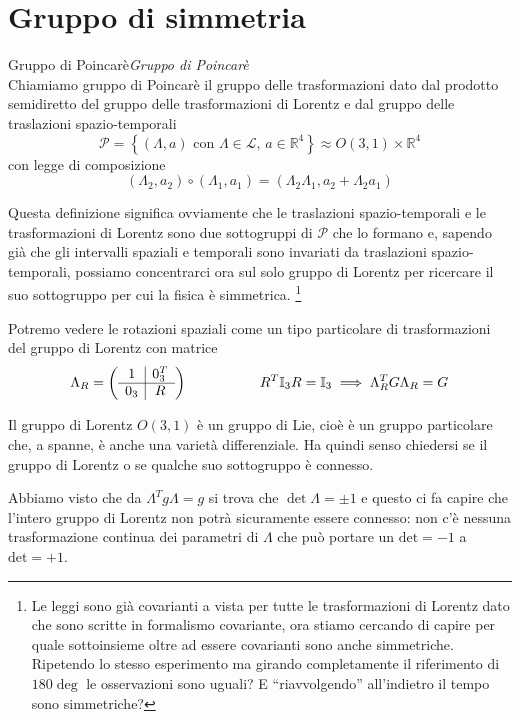 \documentclass[12pt,a4paper,titlepage, twoside, openright]{book}
\newenvironment{definizione}[1][\empty]{\begin{Definizione}{
\ifx\empty#1\relax\else\mdseries\itshape#1\\\fi
}{}}{\end{Definizione}}
\numberwithin{equation}{chapter}
\begin{document}
\section{Gruppo di simmetria}\label{sezGruppo}

\begin{definizione}[Gruppo di Poincarè]
Chiamiamo gruppo di Poincarè il gruppo delle trasformazioni dato dal prodotto semidiretto del gruppo delle trasformazioni di Lorentz e dal gruppo delle traslazioni spazio-temporali
\[
\mathcal{P}=\left\{ (\Lambda,a) \text{ con } \Lambda\in\mathcal{L},\, a\in\mathbb{R}^4   \right\} \approx O(3,1)\times\mathbb{R}^4
\]
con legge di composizione
\[
\left(\Lambda_2,a_2\right) \circ \left(\Lambda_1,a_1\right) = \left(\Lambda_2\Lambda_1, a_2+\Lambda_2a_1\right)
\]
\end{definizione}

Questa definizione significa ovviamente che le traslazioni spazio-temporali e le trasformazioni di Lorentz sono due sottogruppi di $\mathcal{P}$ che lo formano e, sapendo già che gli intervalli spaziali e temporali sono invariati da traslazioni spazio-temporali, possiamo concentrarci ora sul solo gruppo di Lorentz per ricercare il suo sottogruppo per cui la fisica è simmetrica. \footnote{Le leggi sono già covarianti a vista per tutte le trasformazioni di Lorentz dato che sono scritte in formalismo covariante, ora stiamo cercando di capire per quale sottoinsieme oltre ad essere covarianti sono anche simmetriche. Ripetendo lo stesso esperimento ma girando completamente il riferimento di $180\deg$ le osservazioni sono uguali? E ``riavvolgendo'' all'indietro il tempo sono simmetriche?}

Potremo vedere le rotazioni spaziali come un tipo particolare di trasformazioni del gruppo di Lorentz con matrice
\[
\Lambda_R=\left(\begin{array}{c|c}
1 & 0_3^T \\
\hline
0_3 & R \\
\end{array}\right) \hspace{0.15\linewidth} R^T \mathbb{I}_3 R=\mathbb{I}_3 \implies \Lambda_R^T G \Lambda_R = G
\]


Il gruppo di Lorentz $O(3,1)$ è un gruppo di Lie, cioè è un gruppo particolare che, a spanne, è anche una varietà differenziale. Ha quindi senso chiedersi se il gruppo di Lorentz o se qualche suo sottogruppo è connesso.

Abbiamo visto che da $\Lambda^T g \Lambda=g$ si trova che $\det{\Lambda}=\pm1$ e questo ci fa capire che l'intero gruppo di Lorentz non potrà sicuramente essere connesso: non c'è nessuna trasformazione continua dei parametri di $\Lambda$ che può portare un $\text{det}=-1$ a $\text{det}=+1$.
\end{document}
